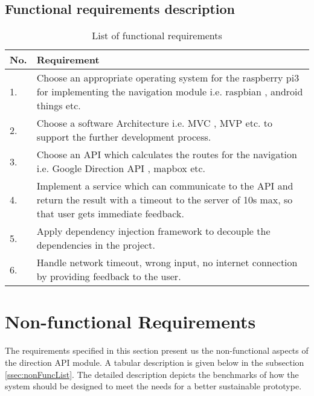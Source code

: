         \subsection{Functional requirements description}
            \label{ssec:FuncList}
            \begin{table}[h!]
                \centering
                    \begin{tabular}{|p{1cm}||p{15cm}|}
                        \hline
                            \textbf{No.} & \textbf{Requirement} \\
                        \hline
                            1. & Choose an appropriate operating system for the raspberry pi3 for implementing 
                            the navigation module i.e. raspbian \cite{raspbien}, 
                            android things \cite{androidThings} etc.\\
                        \hline
                            2. & Choose a software Architecture i.e. MVC \cite{mvc}, MVP \cite{mvp}
                            etc. to support the further development process.\\ 
                        \hline
                            3. & Choose an API which calculates the routes for the navigation i.e. Google Direction API 
                            \cite{googleDirecAPI}, mapbox \cite{mapbox} etc. \\     
                        \hline
                            4. & Implement a service which can communicate to the API and return the result with a 
                            timeout to the server of 10s max, so that user gets immediate feedback. \\    
                        \hline  
                            5. & Apply dependency injection 
                            \cite{Martinfowler2014} framework to decouple the  dependencies 
                            in the project.\\
                        \hline   
                            6. & Handle network timeout, wrong input,
                            no internet connection by providing feedback to the user.\\    
                        \hline    
                    \end{tabular}
                    \caption{List of functional requirements}
                    \label{table:functionalRequirements}
            \end{table}  

    \section{Non-functional Requirements}
        The requirements specified in this section present us the non-functional aspects of the 
        direction API module. A tabular description is given below in the subsection 
        \ref{ssec:nonFuncList}. The detailed description depicts the benchmarks of how the system
        should be designed to meet the needs for a better sustainable prototype.


